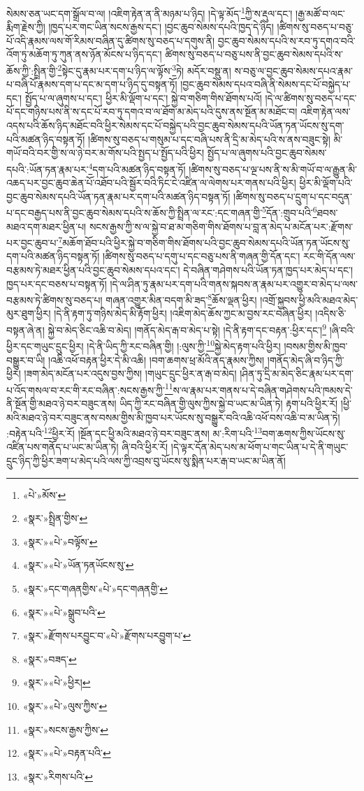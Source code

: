 སེམས་ཅན་ཡང་དག་སྒྲོལ་བ་ལ། །འཇིག་རྟེན་ན་ནི་མཉམ་པ་ཉིད། །དེ་ལྟ་མོད་\footnote{«པེ་»མོས་}ཀྱི་ས་རྡུལ་དང་། །རྒྱ་མཚོ་བ་ལང་རྨིག་རྗེས་ཀྱི། །ཁྱད་པར་གང་ཡིན་སངས་རྒྱས་དང་། །བྱང་ཆུབ་སེམས་དཔའི་ཁྱད་དེ་ཉིད། །ཚིགས་སུ་བཅད་པ་བཅུ་པོ་འདི་རྣམས་ལས་གོ་རིམས་བཞིན་དུ་ཚིགས་སུ་བཅད་པ་དགུས་ནི། བྱང་ཆུབ་སེམས་དཔའི་ས་རབ་ཏུ་དགའ་བའི་འོག་ཏུ་མཆོག་ཏུ་ཀུན་ནས་ཉོན་མོངས་པ་ཉིད་དང་། ཚིགས་སུ་བཅད་པ་བཅུ་པས་ནི་བྱང་ཆུབ་སེམས་དཔའི་ས་ཆོས་ཀྱི་:སྤྲིན་གྱི་\footnote{«སྣར་»སྤྲིན་གྱིས་}སྟེང་དུ་རྣམ་པར་དག་པ་ཉིད་ལ་ལྟོས་\footnote{«སྣར་»«པེ་»བལྟོས་}ཏེ། མདོར་བསྡུ་ན། ས་བཅུ་ལ་བྱང་ཆུབ་སེམས་དཔའ་རྣམ་པ་བཞི་པོ་རྣམས་དག་པ་དང་མ་དག་པ་ཉིད་དུ་བསྟན་ཏོ། །བྱང་ཆུབ་སེམས་དཔའ་བཞི་ནི་སེམས་དང་པོ་བསྐྱེད་པ་དང་། སྤྱོད་པ་ལ་ཞུགས་པ་དང་། ཕྱིར་མི་ལྡོག་པ་དང་། སྐྱེ་བ་གཅིག་གིས་ཐོགས་པའོ། །དེ་ལ་ཚིགས་སུ་བཅད་པ་དང་པོ་དང་གཉིས་པས་ནི་ས་དང་པོ་རབ་ཏུ་དགའ་བ་ལ་ཐོག་མ་མེད་པའི་དུས་ནས་སྔོན་མ་མཐོང་བ། འཇིག་རྟེན་ལས་འདས་པའི་ཆོས་ཉིད་མཐོང་བའི་ཕྱིར་སེམས་དང་པོ་བསྐྱེད་པའི་བྱང་ཆུབ་སེམས་དཔའི་ཡོན་ཏན་ཡོངས་སུ་དག་པའི་མཚན་ཉིད་བསྟན་ཏོ། །ཚིགས་སུ་བཅད་པ་གསུམ་པ་དང་བཞི་པས་ནི་དྲི་མ་མེད་པའི་ས་ནས་བཟུང་སྟེ། མི་གཡོ་བའི་བར་གྱི་ས་ལ་ཉེ་བར་མ་གོས་པའི་སྤྱད་པ་སྤྱོད་པའི་ཕྱིར། སྤྱོད་པ་ལ་ཞུགས་པའི་བྱང་ཆུབ་སེམས་དཔའི་:ཡོན་ཏན་རྣམ་པར་\footnote{«སྣར་»«པེ་»ཡོན་ཏནཡོངས་སུ་}དག་པའི་མཚན་ཉིད་བསྟན་ཏོ། །ཚིགས་སུ་བཅད་པ་ལྔ་པས་ནི་ས་མི་གཡོ་བ་ལ་རྒྱུན་མི་འཆད་པར་བྱང་ཆུབ་ཆེན་པོ་འཐོབ་པའི་སྦྱོར་བའི་ཏིང་ངེ་འཛིན་ལ་ལེགས་པར་གནས་པའི་ཕྱིར། ཕྱིར་མི་ལྡོག་པའི་བྱང་ཆུབ་སེམས་དཔའི་ཡོན་ཏན་རྣམ་པར་དག་པའི་མཚན་ཉིད་བསྟན་ཏོ། །ཚིགས་སུ་བཅད་པ་དྲུག་པ་དང་བདུན་པ་དང་བརྒྱད་པས་ནི་བྱང་ཆུབ་སེམས་དཔའི་ས་ཆོས་ཀྱི་སྤྲིན་ལ་རང་:དང་གཞན་གྱི་\footnote{«སྣར་»དང་གཞནགྱིས་«པེ་»དང་གཞནགྱི་}དོན་:གྲུབ་པའི་\footnote{«སྣར་»«པེ་»སྒྲུབ་པའི་}ཐབས་མཐའ་དག་མཐར་ཕྱིན་པ། སངས་རྒྱས་ཀྱི་ས་ལ་སྐྱེ་བ་ཐ་མ་གཅིག་གིས་ཐོགས་པ་བླ་ན་མེད་པ་མངོན་པར་:རྫོགས་པར་བྱང་ཆུབ་པ་\footnote{«སྣར་»རྫོགས་པརབྱུང་བ་«པེ་»རྫོགས་པརབྱུག་པ་}མཆོག་ཐོབ་པའི་ཕྱིར་སྐྱེ་བ་གཅིག་གིས་ཐོགས་པའི་བྱང་ཆུབ་སེམས་དཔའི་ཡོན་ཏན་ཡོངས་སུ་དག་པའི་མཚན་ཉིད་བསྟན་ཏོ། །ཚིགས་སུ་བཅད་པ་དགུ་པ་དང་བཅུ་པས་ནི་གཞན་གྱི་དོན་དང་། རང་གི་དོན་ལས་བརྩམས་ཏེ་མཐར་ཕྱིན་པའི་བྱང་ཆུབ་སེམས་དཔའ་དང་། དེ་བཞིན་གཤེགས་པའི་ཡོན་ཏན་ཁྱད་པར་མེད་པ་དང་། ཁྱད་པར་དང་བཅས་པ་བསྟན་ཏོ། །དེ་ལ་ཤིན་ཏུ་རྣམ་པར་དག་པའི་གནས་སྐབས་ན་རྣམ་པར་འགྱུར་བ་མེད་པ་ལས་བརྩམས་ཏེ་ཚིགས་སུ་བཅད་པ། གཞན་འགྱུར་མིན་བདག་མི་ཟད་\footnote{«སྣར་»བཟད་}ཆོས་ལྡན་ཕྱིར། །འགྲོ་སྐྱབས་ཕྱི་མའི་མཐའ་མེད་མུར་ཐུག་ཕྱིར། །དེ་ནི་རྟག་ཏུ་གཉིས་མེད་མི་རྟོག་ཕྱིར། །འཇིག་མེད་ཆོས་ཀྱང་མ་བྱས་རང་བཞིན་ཕྱིར། །འདིས་ཅི་བསྟན་ཞེ་ན། སྐྱེ་བ་མེད་ཅིང་འཆི་བ་མེད། །གནོད་མེད་རྒ་བ་མེད་པ་སྟེ། །དེ་ནི་རྟག་དང་བརྟན་:ཕྱིར་དང་།\footnote{«སྣར་»«པེ་»ཕྱིར།} །ཞི་བའི་ཕྱིར་དང་གཡུང་དྲུང་ཕྱིར། །དེ་ནི་ཡིད་ཀྱི་རང་བཞིན་གྱི། །:ལུས་ཀྱི་\footnote{«སྣར་»«པེ་»ལུས་ཀྱིས་}སྐྱེ་མེད་རྟག་པའི་ཕྱིར། །བསམ་གྱིས་མི་ཁྱབ་བསྒྱུར་བ་ཡི། །འཆི་འཕོ་བརྟན་ཕྱིར་དེ་མི་འཆི། །བག་ཆགས་ཕྲ་མོའི་ནད་རྣམས་ཀྱིས། །གནོད་མེད་ཞི་བ་ཉིད་ཀྱི་ཕྱིར། །ཟག་མེད་མངོན་པར་འདུས་བྱས་ཀྱིས། །གཡུང་དྲུང་ཕྱིར་ན་རྒ་བ་མེད། །ཤིན་ཏུ་དྲི་མ་མེད་ཅིང་རྣམ་པར་དག་པ་འོད་གསལ་བ་རང་གི་རང་བཞིན་:སངས་རྒྱས་ཀྱི་\footnote{«སྣར་»སངས་རྒྱས་ཀྱིས་}ས་ལ་རྣམ་པར་གནས་པ་དེ་བཞིན་གཤེགས་པའི་ཁམས་དེ་ནི་སྔོན་གྱི་མཐའ་ཉེ་བར་བཟུང་ནས། ཡིད་ཀྱི་རང་བཞིན་གྱི་ལུས་ཀྱིས་སྐྱེ་བ་ཡང་མ་ཡིན་ཏེ། རྟག་པའི་ཕྱིར་རོ། །ཕྱི་མའི་མཐའ་ཉེ་བར་བཟུང་ནས་བསམ་གྱིས་མི་ཁྱབ་པར་ཡོངས་སུ་བསྒྱུར་བའི་འཆི་འཕོ་བས་འཆི་བ་མ་ཡིན་ཏེ། :བརྟེན་པའི་\footnote{«སྣར་»«པེ་»བརྟན་པའི་}ཕྱིར་རོ། །སྔོན་དང་ཕྱི་མའི་མཐའ་ཉེ་བར་བཟུང་ནས། མ་:རིག་པའི་\footnote{«སྣར་»རིགས་པའི་}བག་ཆགས་ཀྱིས་ཡོངས་སུ་འཛིན་པས་གནོད་པ་ཡང་མ་ཡིན་ཏེ། ཞི་བའི་ཕྱིར་རོ། །དེ་ལྟར་དོན་མེད་པས་མ་ཕོག་པ་གང་ཡིན་པ་དེ་ནི་གཡུང་དྲུང་ཉིད་ཀྱི་ཕྱིར་ཟག་པ་མེད་པའི་ལས་ཀྱི་འབྲས་བུ་ཡོངས་སུ་སྨིན་པར་རྒ་བ་ཡང་མ་ཡིན་ནོ། 